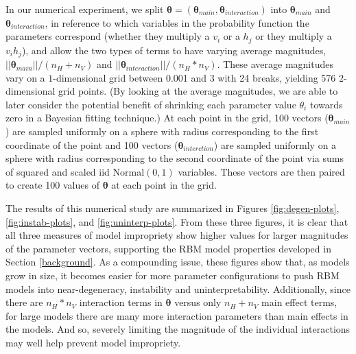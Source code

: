\documentclass[]{article}
\theoremstyle{definition}
\newcommand{\nv}{{n_{\scriptscriptstyle V}}}
\newcommand{\nh}{{n_{\scriptscriptstyle H}}}
\begin{document}
In our numerical experiment, we split
\(\boldsymbol \theta = (\boldsymbol \theta_{main}, \boldsymbol \theta_{interaction})\)
into \(\boldsymbol \theta_{main}\) and
\(\boldsymbol \theta_{interaction}\), in reference to which variables in
the probability function the parameters correspond (whether they
multiply a \(v_i\) or a \(h_j\) or they multiply a \(v_i h_j\)), and
allow the two types of terms to have varying average magnitudes,
\(||\boldsymbol \theta_{main} || /(\nh+\nv)\) and
\(||\boldsymbol \theta_{interaction} || /(\nh*\nv)\). These average
magnitudes vary on a \(1\)-dimensional grid between 0.001 and 3 with 24
breaks, yielding 576 \(2\)-dimensional grid points. (By looking at the
average magnitudes, we are able to later consider the potential benefit
of shrinking each parameter value \(\theta_i\) towards zero in a
Bayesian fitting technique.) At each point in the grid, 100 vectors
(\(\boldsymbol \theta_{main}\)) are sampled uniformly on a sphere with
radius corresponding to the first coordinate of the point and 100
vectors (\(\boldsymbol \theta_{interction}\)) are sampled uniformly on a
sphere with radius corresponding to the second coordinate of the point
via sums of squared and scaled iid Normal\((0, 1)\) variables. These
vectors are then paired to create 100 values of \(\boldsymbol \theta\)
at each point in the grid.

The results of this numerical study are summarized in Figures
\ref{fig:degen-plots}, \ref{fig:instab-plots}, and
\ref{fig:uninterp-plots}. From these three figures, it is clear that all
three measures of model impropriety show higher values for larger
magnitudes of the parameter vectors, supporting the RBM model properties
developed in Section \ref{background}. As a compounding issue, these
figures show that, as models grow in size, it becomes easier for more
parameter configurations to push RBM models into near-degeneracy,
instability and uninterpretability. Additionally, since there are
\(\nh*\nv\) interaction terms in \(\boldsymbol \theta\) versus only
\(\nh + \nv\) main effect terms, for large models there are many more
interaction parameters than main effects in the models. And so, severely
limiting the magnitude of the individual interactions may well help
prevent model impropriety.
\end{document}
